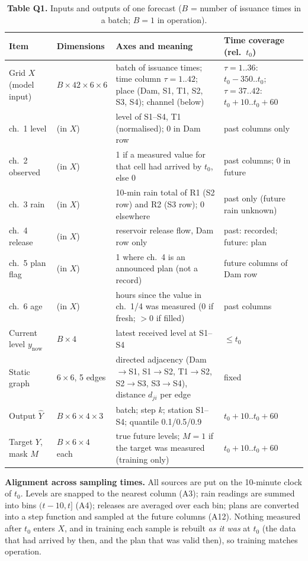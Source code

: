 \begin{table}[H]
\centering\small
\begin{tabularx}{\textwidth}{@{}p{2.7cm}p{2.4cm}Y p{3.6cm}@{}}
\toprule
\textbf{Item} & \textbf{Dimensions} & \textbf{Axes and meaning} & \textbf{Time coverage (rel.\ $t_0$)}\\
\midrule
Grid $X$ (model input) & $B\times42\times6\times6$ & batch of issuance times; time column $\tau=1..42$; place (Dam, S1, T1, S2, S3, S4); channel (below) & $\tau=1..36$: $t_0{-}350..t_0$; $\tau=37..42$: $t_0{+}10..t_0{+}60$\\
\quad ch.\ 1 level & (in $X$) & level of S1--S4, T1 (normalised); 0 in Dam row & past columns only\\
\quad ch.\ 2 observed & (in $X$) & 1 if a measured value for that cell had arrived by $t_0$, else 0 & past columns; 0 in future\\
\quad ch.\ 3 rain & (in $X$) & 10-min rain total of R1 (S2 row) and R2 (S3 row); 0 elsewhere & past only (future rain unknown)\\
\quad ch.\ 4 release & (in $X$) & reservoir release flow, Dam row only & past: recorded; future: plan\\
\quad ch.\ 5 plan flag & (in $X$) & 1 where ch.\ 4 is an announced plan (not a record) & future columns of Dam row\\
\quad ch.\ 6 age & (in $X$) & hours since the value in ch.\ 1/4 was measured (0 if fresh; $>0$ if filled) & past columns\\
Current level $y_{\mathrm{now}}$ & $B\times4$ & latest received level at S1--S4 & $\le t_0$\\
Static graph & $6\times6$, 5 edges & directed adjacency (Dam$\to$S1, S1$\to$S2, T1$\to$S2, S2$\to$S3, S3$\to$S4), distance $d_{ji}$ per edge & fixed\\
Output $\hat Y$ & $B\times6\times4\times3$ & batch; step $k$; station S1--S4; quantile 0.1/0.5/0.9 & $t_0{+}10..t_0{+}60$\\
Target $Y$, mask $M$ & $B\times6\times4$ each & true future levels; $M=1$ if the target was measured (training only) & $t_0{+}10..t_0{+}60$\\
\bottomrule
\end{tabularx}
\caption*{\textbf{Table Q1.} Inputs and outputs of one forecast ($B$ = number of issuance times in a batch; $B=1$ in operation).}
\label{tab:q1data}
\end{table}

\textbf{Alignment across sampling times.} All sources are put on the 10-minute clock of $t_0$. Levels are snapped to the nearest column (A3); rain readings are summed into bins $(t-10,t]$ (A4); releases are averaged over each bin; plans are converted into a step function and sampled at the future columns (A12). Nothing measured after $t_0$ enters $X$, and in training each sample is rebuilt \emph{as it was} at $t_0$ (the data that had arrived by then, and the plan that was valid then), so training matches operation.

